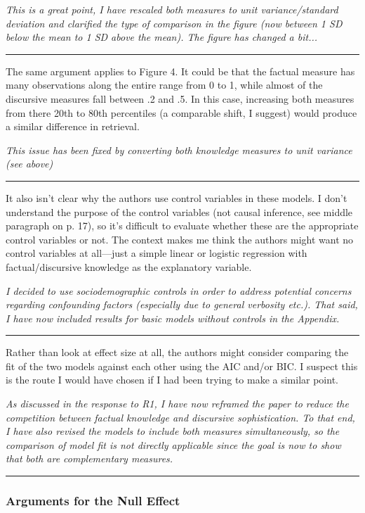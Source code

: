 \textit{This is a great point, I have rescaled both measures to unit variance/standard deviation and clarified the type of comparison in the figure (now between 1 SD below the mean to 1 SD above the mean). The figure has changed a bit...}

\rule{\linewidth}{.01cm}

The same argument applies to Figure 4. It could be that the factual measure has many observations along the entire range from 0 to 1, while almost of the discursive measures fall between .2 and .5. In this case, increasing both measures from there 20th to 80th percentiles (a comparable shift, I suggest) would produce a similar difference in retrieval.

\textit{This issue has been fixed by converting both knowledge measures to unit variance (see above)}

\rule{\linewidth}{.01cm}

It also isn’t clear why the authors use control variables in these models. I don’t understand the purpose of the control variables (not causal inference, see middle paragraph on p. 17), so it’s difficult to evaluate whether these are the appropriate control variables or not. The context makes me think the authors might want no control variables at all—just a simple linear or logistic regression with factual/discursive knowledge as the explanatory variable.

\textit{I decided to use sociodemographic controls in order to address potential concerns regarding confounding factors (especially due to general verbosity etc.). That said, I have now included results for basic models without controls in the Appendix.}

\rule{\linewidth}{.01cm}

Rather than look at effect size at all, the authors might consider comparing the fit of the two models against each other using the AIC and/or BIC. I suspect this is the route I would have chosen if I had been trying to make a similar point.

\textit{As discussed in the response to R1, I have now reframed the paper to reduce the competition between factual knowledge and discursive sophistication. To that end, I have also revised the models to include both measures simultaneously, so the comparison of model fit is not directly applicable since the goal is now to show that both are complementary measures.}

\rule{\linewidth}{.01cm}

\subsubsection*{Arguments for the Null Effect}

